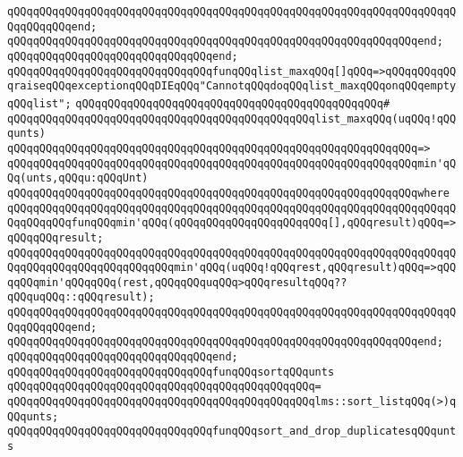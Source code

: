 \verb|qQQqqQQqqQQqqQQqqQQqqQQqqQQqqQQqqQQqqQQqqQQqqQQqqQQqqQQqqQQqqQQqqQQqqQQqqQQqqQQqend;|\newline
\verb|qQQqqQQqqQQqqQQqqQQqqQQqqQQqqQQqqQQqqQQqqQQqqQQqqQQqqQQqqQQqqQQqend;|\newline
\verb|qQQqqQQqqQQqqQQqqQQqqQQqqQQqqQQqend;|\newline
\newline
\verb|qQQqqQQqqQQqqQQqqQQqqQQqqQQqqQQqfunqQQqlist_maxqQQq[]qQQq=>qQQqqQQqqQQqraiseqQQqexceptionqQQqDIEqQQq"CannotqQQqdoqQQqlist_maxqQQqonqQQqemptyqQQqlist";|\newline
\verb|qQQqqQQqqQQqqQQqqQQqqQQqqQQqqQQqqQQqqQQqqQQqqQQq#|\newline
\verb|qQQqqQQqqQQqqQQqqQQqqQQqqQQqqQQqqQQqqQQqqQQqqQQqlist_maxqQQq(uqQQq!qQQqunts)|\newline
\verb|qQQqqQQqqQQqqQQqqQQqqQQqqQQqqQQqqQQqqQQqqQQqqQQqqQQqqQQqqQQqqQQq=>|\newline
\verb|qQQqqQQqqQQqqQQqqQQqqQQqqQQqqQQqqQQqqQQqqQQqqQQqqQQqqQQqqQQqqQQqmin'qQQq(unts,qQQqu:qQQqUnt)|\newline
\verb|qQQqqQQqqQQqqQQqqQQqqQQqqQQqqQQqqQQqqQQqqQQqqQQqqQQqqQQqqQQqqQQqwhere|\newline
\verb|qQQqqQQqqQQqqQQqqQQqqQQqqQQqqQQqqQQqqQQqqQQqqQQqqQQqqQQqqQQqqQQqqQQqqQQqqQQqqQQqfunqQQqmin'qQQq(qQQqqQQqqQQqqQQqqQQqqQQq[],qQQqresult)qQQq=>qQQqqQQqresult;|\newline
\verb|qQQqqQQqqQQqqQQqqQQqqQQqqQQqqQQqqQQqqQQqqQQqqQQqqQQqqQQqqQQqqQQqqQQqqQQqqQQqqQQqqQQqqQQqqQQqqQQqmin'qQQq(uqQQq!qQQqrest,qQQqresult)qQQq=>qQQqqQQqmin'qQQqqQQq(rest,qQQqqQQquqQQq>qQQqresultqQQq??qQQquqQQq::qQQqresult);|\newline
\verb|qQQqqQQqqQQqqQQqqQQqqQQqqQQqqQQqqQQqqQQqqQQqqQQqqQQqqQQqqQQqqQQqqQQqqQQqqQQqqQQqend;|\newline
\verb|qQQqqQQqqQQqqQQqqQQqqQQqqQQqqQQqqQQqqQQqqQQqqQQqqQQqqQQqqQQqqQQqend;|\newline
\verb|qQQqqQQqqQQqqQQqqQQqqQQqqQQqqQQqend;|\newline
\newline
\verb|qQQqqQQqqQQqqQQqqQQqqQQqqQQqqQQqfunqQQqsortqQQqunts|\newline
\verb|qQQqqQQqqQQqqQQqqQQqqQQqqQQqqQQqqQQqqQQqqQQqqQQq=|\newline
\verb|qQQqqQQqqQQqqQQqqQQqqQQqqQQqqQQqqQQqqQQqqQQqqQQqlms::sort_listqQQq(>)qQQqunts;|\newline
\newline
\verb|qQQqqQQqqQQqqQQqqQQqqQQqqQQqqQQqfunqQQqsort_and_drop_duplicatesqQQqunts|\newline
